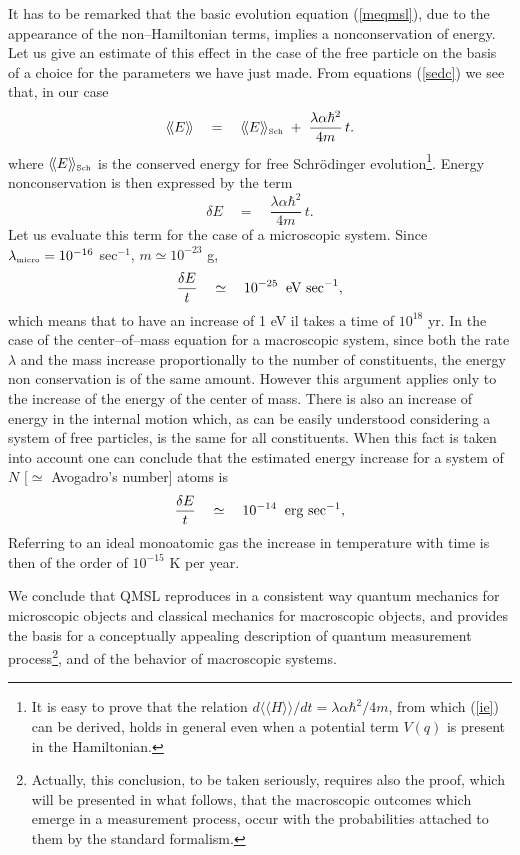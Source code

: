 \documentclass[12pt]{article}
\newcommand{\llangle}{\langle\!\langle}
\newcommand{\rrangle}{\rangle\!\rangle}
\begin{document}
It has to be remarked that the basic evolution equation
(\ref{meqmsl}), due to the appearance of the non--Hamiltonian
terms, implies a nonconservation of energy. Let us give an
estimate of this effect in the case of the free particle on the
basis of a choice for the parameters we have just made. From
equations (\ref{sedc}) we see that, in our case
\begin{equation} \label{ie}
\llangle E \rrangle \quad = \quad \llangle E
\rrangle_{\makebox{\tiny Sch}} \; + \;
\frac{\lambda\alpha\hbar^{2}}{4m}\, t.
\end{equation}
where $\llangle E \rrangle_{\makebox{\tiny Sch}}$ is the conserved
energy for free Schr\"odinger evolution\footnote{It is easy to
prove that the relation $d\llangle H \rrangle/dt = \lambda \alpha
\hbar^{2}/4m$, from which (\ref{ie}) can be derived, holds in
general even when a potential term $V(q)$ is present in the
Hamiltonian.}. Energy nonconservation is then expressed by the
term
\begin{equation}
\delta E \quad = \quad \frac{\lambda\alpha\hbar^{2}}{4m}\, t.
\end{equation}
Let us evaluate this term for the case of a microscopic system.
Since $\lambda_{\makebox{\tiny micro}} = 10^{-16}$ sec$^{-1}$, $m
\simeq 10^{-23}$ g,
\begin{equation}
\frac{\delta E}{t} \quad \simeq \quad 10^{-25} \;\; \makebox{eV
sec}^{-1},
\end{equation}
which means that to have an increase of 1 eV il takes a time of
$10^{18}$ yr. In the case of the center--of--mass equation for a
macroscopic system, since both the rate $\lambda$ and the mass
increase proportionally to the number of constituents, the energy
non conservation is of the same amount. However this argument
applies only to the increase of the energy of the center of mass.
There is also an increase of energy in the internal motion which,
as can be easily understood considering a system of free
particles, is the same for all constituents. When this fact is
taken into account one can conclude that the estimated energy
increase for a system of $N$  $[\simeq$ Avogadro's number] atoms is
\begin{equation}
\frac{\delta E}{t} \quad \simeq \quad 10^{-14} \;\; \makebox{erg
sec}^{-1},
\end{equation}
Referring to an ideal monoatomic gas the increase in temperature
with time is then of the order of $10^{-15}$ K per year.

We conclude that QMSL reproduces in a consistent way quantum
mechanics for microscopic objects and classical mechanics for
macroscopic objects, and provides the basis for a conceptually
appealing description of quantum measurement
process\footnote{Actually, this conclusion, to be taken seriously,
requires also the proof, which will be presented in what follows,
that the macroscopic outcomes which emerge in a measurement
process, occur with the probabilities attached to them by the
standard formalism.}, and of the behavior of macroscopic systems.
\end{document}
